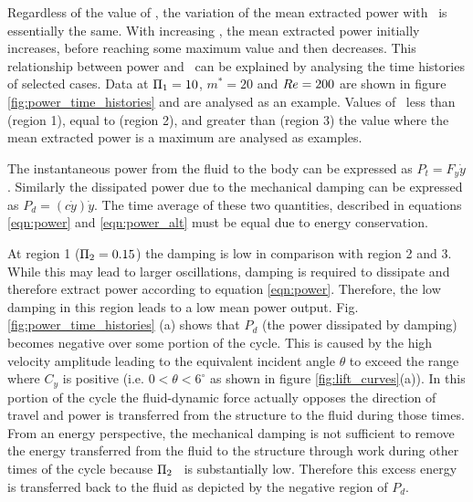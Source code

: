 Regardless of the value of \massstiff, the variation of the mean extracted power with \massdamp\ is essentially the same. With increasing \massdamp, the mean extracted power initially increases, before reaching some maximum value and then decreases. This relationship between power and \massdamp\ can be explained by analysing the time histories of selected cases. Data at $\Pi_1=10$, $m^*=20$ and $Re=200$ are shown in figure \ref{fig:power_time_histories} and are analysed as an example. Values of \massdamp\ less than (region 1), equal to (region 2), and greater than (region 3) the value where the mean extracted power is a maximum are analysed as examples.



The instantaneous power from the fluid to the body can be expressed as $P_t=F_y\dot{y}$. Similarly the dissipated power due to the mechanical damping can be expressed as $P_d=(c\dot{y})\dot{y}$. The time average of these two quantities, described in equations \ref{eqn:power} and \ref{eqn:power_alt} must be equal due to energy conservation.



At region 1 ($\Pi_2=0.15$) the damping is low in comparison with region 2 and 3. While this may lead to larger oscillations, damping is required to dissipate and therefore extract power according to equation \ref{eqn:power}. Therefore, the low damping in this region leads to a low mean power output. Fig.\ref{fig:power_time_histories} (a) shows that $P_d$ (the power dissipated by damping) becomes negative over some portion of the cycle. This is caused by the high velocity amplitude leading to the equivalent incident angle $\theta$ to exceed the range where $C_y$ is positive (i.e. $0<\theta<6^\circ$ as shown in figure \ref{fig:lift_curves}(a)). In this portion of the cycle the fluid-dynamic force actually opposes the direction of travel and power is transferred from the structure to the fluid during those times. From an energy perspective, the mechanical damping is not sufficient to remove the energy transferred from the fluid to the structure through work during other times of the cycle because $\Pi_2$ \ is substantially low. Therefore this excess energy is transferred back to the fluid as depicted by the negative region of $P_d$.

